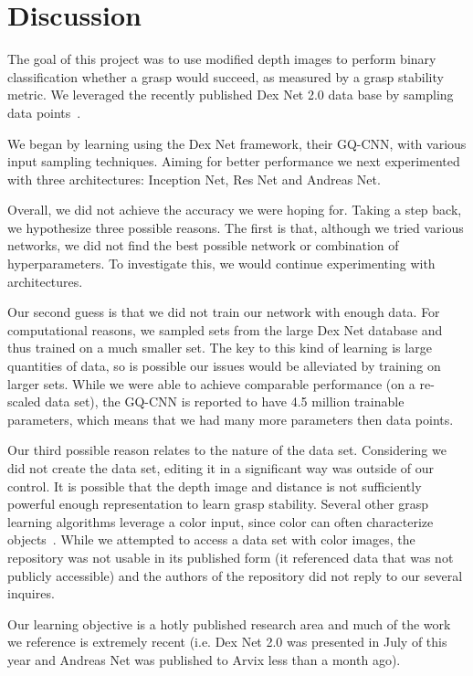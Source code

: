 
\section{Discussion}
\label{sec:discussion}

The goal of this project was to use modified depth images to perform binary classification whether a grasp would succeed, as measured by a grasp stability metric. 
We leveraged the recently published Dex Net 2.0 data base by sampling data points~\cite{mahler2017dex}. 

We began by learning using the Dex Net framework, their GQ-CNN, with various input sampling techniques. 
Aiming for better performance we next experimented with three architectures: Inception Net, Res Net and Andreas Net. 

Overall, we did not achieve the accuracy we were hoping for. 
Taking a step back, we hypothesize three possible reasons. 
The first is that, although we tried various networks, we did not find the best possible network or combination of hyperparameters. 
To investigate this, we would continue experimenting with architectures. 

Our second guess is that we did not train our network with enough data. 
For computational reasons, we sampled sets from the large Dex Net database and thus trained on a much smaller set. 
The key to this kind of learning is large quantities of data, so is possible our issues would be alleviated by training on larger sets. 
While we were able to achieve comparable performance (on a re-scaled data set), the GQ-CNN is reported to have 4.5 million trainable parameters, which means that we had many more parameters then data points. 

Our third possible reason relates to the nature of the data set. 
Considering we did not create the data set, editing it in a significant way was outside of our control. 
It is possible that the depth image and distance is not sufficiently powerful enough representation to learn grasp stability. 
Several other grasp learning algorithms leverage a color input, since color can often characterize objects~\cite{zeng2017robotic}.  
While we attempted to access a data set with color images, the repository was not usable in its published form (it referenced data that was not publicly accessible) and the authors of the repository did not reply to our several inquires. 

Our learning objective is a hotly published research area and much of the work we reference is extremely recent (i.e. Dex Net 2.0 was presented in July of this year and Andreas Net was published to Arvix less than a month ago). 